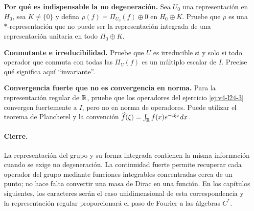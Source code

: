 \begin{ejercicio}\label{ej:v4-l24-6}
\textbf{Por qué es indispensable la no degeneración.}
Sea $U_0$ una representación en $H_0$, sea $K\ne\{0\}$ y defina $\rho(f)=\Pi_{U_0}(f)\oplus0$ en $H_0\oplus K$. Pruebe que $\rho$ es una $*$-representación que no puede ser la representación integrada de una representación unitaria en todo $H_0\oplus K$.

\end{ejercicio}


\begin{ejercicio}\label{ej:v4-l24-7}
\textbf{Conmutante e irreducibilidad.}
Pruebe que $U$ es irreducible si y solo si todo operador que conmuta con todas las $\Pi_U(f)$ es un múltiplo escalar de $I$. Precise qué significa aquí ``invariante''.

\end{ejercicio}


\begin{ejercicio}\label{ej:v4-l24-8}
\textbf{Convergencia fuerte que no es convergencia en norma.}
Para la representación regular de $\mathbb R$, pruebe que los operadores del ejercicio \ref{ej:v4-l24-3} convergen fuertemente a $I$, pero no en norma de operadores. Puede utilizar el teorema de Plancherel y la convención $\widehat f(\xi)=\int_\mathbb R f(x)e^{-i\xi x}dx$.

\end{ejercicio}




\paragraph{Cierre.} La representación del grupo y su forma integrada contienen la misma información cuando se exige no degeneración. La continuidad fuerte permite recuperar cada operador del grupo mediante funciones integrables concentradas cerca de un punto; no hace falta convertir una masa de Dirac en una función. En los capítulos siguientes, los caracteres serán el caso unidimensional de esta correspondencia y la representación regular proporcionará el paso de Fourier a las álgebras $C^*$.
